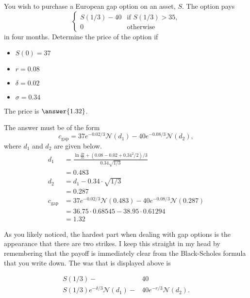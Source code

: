 \documentclass{ximera}
\begin{document}
\begin{question}
You wish to purchase a European gap option on an asset, $S$. The option pays
	\begin{equation*}
		\begin{cases}
		S(1/3)-40	 &\text{if }S(1/3)>35,\\
		0 		&\text{otherwise}
		\end{cases}
	\end{equation*}
in four months. Determine the price of the option if
	\begin{itemize}
	\item $S(0)=37$\\
	\item $r=0.08$\\
	\item $\delta=0.02$\\
	\item $\sigma=0.34$
	\end{itemize}
The price is $\answer{1.32}$.
\end{question}

\begin{solution}
The answer must be of the form
	\begin{equation*}
	c_{\text{gap}}=37e^{-0.02/3}\mathcal{N}(d_1)-40e^{-0.08/3}\mathcal{N}(d_2),
	\end{equation*}
where $d_1$ and $d_2$ are given below.
	\begin{align*}
	d_1 			&=\frac{\ln\frac{37}{35}+(0.08-0.02+0.34^2/2)/3}{0.34\sqrt{1/3}}\\
				&=0.483\\
	d_2 			&=d_1-0.34\cdot\sqrt{1/3}\\
				&=0.287\\
	c_{\text{gap}} 	&=37e^{-0.02/3}\mathcal{N}(0.483)-40e^{-0.08/3}\mathcal{N}(0.287)\\
				&=36.75\cdot 0.68545-38.95\cdot 0.61294\\
				&=1.32
	\end{align*}
\end{solution}

As you likely noticed, the hardest part when dealing with gap options is the appearance that there are two strikes. I keep this straight in my head by remembering that the payoff is immediately clear from the Black-Scholes formula that you write down. The was that is displayed above is

\begin{align*}
S(1/3)-&40\\
S(1/3)e^{-\delta/3}\mathcal{N}(d_1)-&40e^{-r/3}\mathcal{N}(d_2).
\end{align*}
\end{document}
